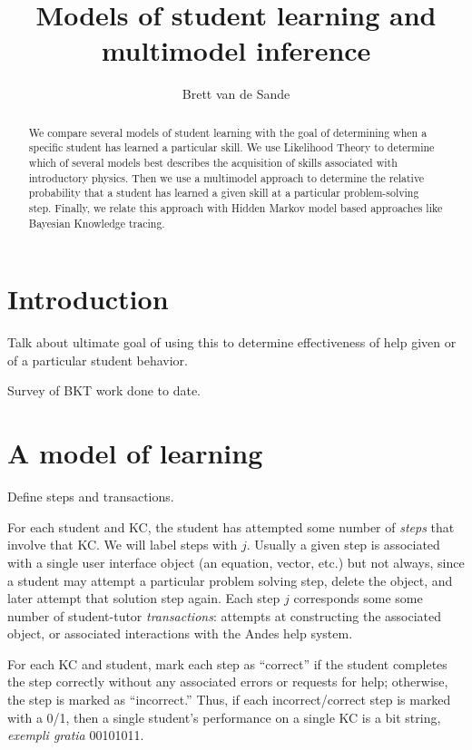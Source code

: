 \documentclass[11pt,letterpaper]{article}
\begin{document}
\title{Models of student learning and multimodel inference}
\author{Brett van de Sande}

\maketitle

\begin{abstract}
We compare several models of student learning with the goal of 
determining when a specific student has learned a particular skill.  
We use Likelihood Theory to determine
which of several models best describes the acquisition
of skills associated with introductory physics.  Then we
use a multimodel approach to determine the relative probability
that a student has learned a given skill at a particular 
problem-solving step.  Finally, we relate this
approach with Hidden Markov model based approaches like
Bayesian Knowledge tracing.
\end{abstract}

\section{Introduction}

Talk about ultimate goal of using this to determine effectiveness
of help given or of a particular student behavior.

Survey of BKT work done to date.

\section{A model of learning}

Define steps and transactions.

For each student and KC, the student has attempted some number of 
{\em steps} that involve that KC.   We will label
steps with $j$.  Usually a given step is associated
with a single user interface object (an equation, vector, etc.)  but
not always, since a student may attempt a particular problem solving
step, delete the object, and later attempt that solution step again.
Each step $j$ corresponds some some number of student-tutor 
{\em transactions}: attempts at constructing the associated object, 
or associated interactions with the Andes help system.  

For each KC and student, mark each step as ``correct'' if
the student completes the step correctly without any associated errors or 
requests for help; otherwise, the step is marked as ``incorrect.''
\label{steps} 
%
Thus, if each incorrect/correct step is marked with a 0/1, then
a single student's performance on a single KC is a bit string,
{\em exempli gratia} 00101011.
\end{document}

